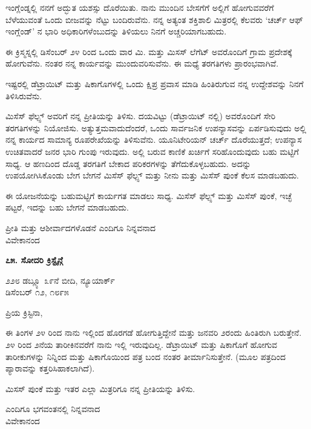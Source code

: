 ಇಂಗ್ಲೆಂಡ್ನಲ್ಲಿ ನನಗೆ ಅದ್ಭುತ ಯಶಸ್ಸು ದೊರೆಯಿತು. ನಾನು ಮುಂದಿನ ಬೇಸಗೆಗೆ ಅಲ್ಲಿಗೆ ಹೋಗುವವರೆಗೆ ಬೆಳೆಯುವಂತೆ ಒಂದು ಬೀಜವನ್ನು ನೆಟ್ಟು ಬಂದಿರುವೆನು. ನನ್ನ ಅತ್ಯಂತ ಶಕ್ತಿಶಾಲಿ ಮಿತ್ರರಲ್ಲಿ ಕೆಲವರು ‘ಚರ್ಚ್ ಆಫ್ ಇಂಗ್ಲೆಂಡ್’ ನ ಭಾರಿ ಅಧಿಕಾರಿಗಳೆಂಬುದನ್ನು ತಿಳಿಯಲು ನಿನಗೆ ಅಚ್ಚರಿಯಾಗಬಹುದು.

ಈ ಕ್ರಿಸ್ಮಸ್ನಲ್ಲಿ ಡಿಸೆಂಬರ್ ೨೪ ರಿಂದ ಒಂದು ವಾರ ಮಿ. ಮತ್ತು ಮಿಸಸ್ ಲೆಗೆಟ್ ಅವರೊಂದಿಗೆ ಗ್ರಾಮ ಪ್ರದೇಶಕ್ಕೆ ಹೋಗುವೆನು. ನಂತರ ನನ್ನ ಕಾರ್ಯವನ್ನು ಮುಂದುವರಿಸುವೆನು. ಈ ಮಧ್ಯೆ ತರಗತಿಗಳು ಪ್ರಾರಂಭವಾಗಿವೆ.

ಇಷ್ಟರಲ್ಲಿ ಡೆಟ್ರಾಯಿಟ್ ಮತ್ತು ಷಿಕಾಗೊಗಳಲ್ಲಿ ಒಂದು ಕ್ಷಿಪ್ರ ಪ್ರವಾಸ ಮಾಡಿ ಹಿಂತಿರುಗುವ ನನ್ನ ಉದ್ದೇಶವನ್ನು ನಿನಗೆ ತಿಳಿಸಿರುವೆನು.

ಮಿಸೆಸ್ ಫೆಲ್ಪ್ಸ್ ಅವರಿಗೆ ನನ್ನ ಪ್ರೀತಿಯನ್ನು ತಿಳಿಸು. ದಯವಿಟ್ಟು (ಡೆಟ್ರಾಯಿಟ್ ನಲ್ಲಿ) ಅವರೊಂದಿಗೆ ಸೇರಿ ತರಗತಿಗಳನ್ನು ನಿಯೋಜಿಸು. ಅತ್ಯುತ್ತಮವಾದುದೆಂದರೆ, ಒಂದು ಸಾರ್ವಜನಿಕ ಉಪನ್ಯಾಸವನ್ನು ಏರ್ಪಡಿಸುವುದು ಅಲ್ಲಿ ನನ್ನ ಕಾರ್ಯದ ಸಾಮಾನ್ಯ ರೂಪರೇಖೆಯನ್ನು ತಿಳಿಸುವೆನು. ಯೂನಿಟೇರಿಯನ್ ಚರ್ಚ್ ದೊರೆಯುತ್ತದೆ; ಉಪನ್ಯಾಸ ಉಚಿತವಾದರೆ ಜನರ ಭಾರಿ ಗುಂಪು ಇರುವುದು. ಅಲ್ಲಿ ಬರುವ ಕಾಣಿಕೆ ಖರ್ಚಿಗೆ ಸರಿಹೊಂದುವುದು ಬಹು ಮಟ್ಟಿಗೆ ಸಾಧ್ಯ. ಆ ಹಣದಿಂದ ದೊಡ್ಡ ತರಗತಿಗೆ ಬೇಕಾದ ಪರಿಕರಗಳನ್ನು ತೆಗೆದುಕೊಳ್ಳಬಹುದು. ಅದನ್ನು ಉಪಯೋಗಿಸಿಕೊಂಡು ಬೇಗ ಬೇಗನೆ ಮಿಸೆಸ್ ಫೆಲ್ಪ್ಸ್ ಮತ್ತು ನೀನು ಮತ್ತು ಮಿಸೆಸ್ ಪುಂಕೆ ಕೆಲಸ ಮಾಡಬಹುದು.

ಈ ಯೋಜನೆಯನ್ನು ಬಹುಮಟ್ಟಿಗೆ ಕಾರ್ಯಗತ ಮಾಡಲು ಸಾಧ್ಯ. ಮಿಸೆಸ್ ಫೆಲ್ಪ್ಸ್ ಮತ್ತು ಮಿಸೆಸ್ ಪುಂಕೆ, ಇಚ್ಛೆ ಪಟ್ಟರೆ, ಇದನ್ನು ಬಹು ಬೇಗನೆ ಮಾಡಬಹುದು.

\begin{flushright}
ಪ್ರೀತಿ ಮತ್ತು ಆಶೀರ್ವಾದಗಳೊಡನೆ ಎಂದಿಗೂ ನಿನ್ನವನಾದ\\ವಿವೇಕಾನಂದ
\end{flushright}

\begin{center}
\textbf{೭೫. ಸೋದರಿ ಕ್ರಿಸ್ಟೈನ್ಗೆ}
\end{center}

\begin{flushright}
೨೨೮ ಡಬ್ಲ್ಯೂ ೩೯ನೆ ಬೀದಿ, ನ್ಯೂಯಾರ್ಕ್\\ಡಿಸೆಂಬರ್ ೧೨, ೧೮೯೫
\end{flushright}

ಪ್ರಿಯ ಕ್ರಿಸ್ಟಿನಾ,

ಈ ತಿಂಗಳ ೨೪ ರಿಂದ ನಾನು ಇಲ್ಲಿಂದ ಹೊರಗಡೆ ಹೋಗುತ್ತಿದ್ದೇನೆ ಮತ್ತು ಜನವರಿ ೨ರಂದು ಹಿಂತಿರುಗಿ ಬರುತ್ತೇನೆ. ೨೪ ರಿಂದ ೨ನೆಯ ತಾರೀಕಿನವರೆಗೆ ನಾನು ಇಲ್ಲಿ ಇರುವುದಿಲ್ಲ. ಡೆಟ್ರಾಯಿಟ್ ಮತ್ತು ಷಿಕಾಗೊಗೆ ಹೋಗುವ ತಾರೀಕುಗಳನ್ನು ನಿನ್ನಿಂದ ಮತ್ತು ಷಿಕಾಗೊಯಿಂದ ಪತ್ರ ಬಂದ ನಂತರ ತೀರ್ಮಾನಿಸುತ್ತೇನೆ. (ಮೂಲ ಪತ್ರದಿಂದ ಪ್ಯಾರಾವನ್ನು ಕತ್ತರಿಸಿಹಾಕಲಾಗಿದೆ).

ಮಿಸಸ್ ಪುಂಕೆ ಮತ್ತು ಇತರ ಎಲ್ಲಾ ಮಿತ್ರರಿಗೂ ನನ್ನ ಪ್ರೀತಿಯನ್ನು ತಿಳಿಸು.

\begin{flushright}
ಎಂದಿಗೂ ಭಗವಂತನಲ್ಲಿ ನಿನ್ನವನಾದ\\ವಿವೇಕಾನಂದ
\end{flushright}

